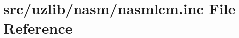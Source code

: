 \hypertarget{nasmlcm_8inc}{}\section{src/uzlib/nasm/nasmlcm.inc File Reference}
\label{nasmlcm_8inc}
